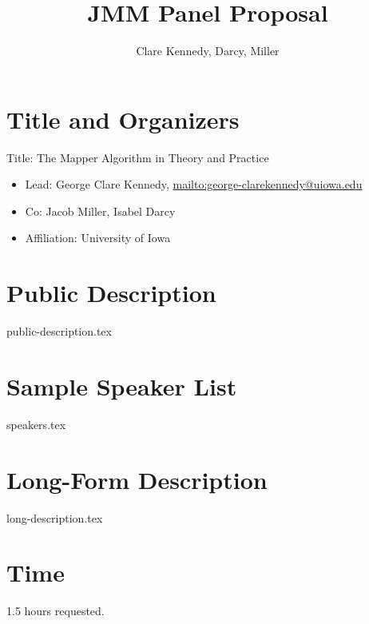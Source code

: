 \documentclass{article}
\title{JMM Panel Proposal}
\author{Clare Kennedy, Darcy, Miller}
\date{}
\begin{document}
\maketitle

\section{Title and Organizers}

Title: The Mapper Algorithm in Theory and Practice

\begin{itemize}
    \item Lead: George Clare Kennedy, \url{mailto:george-clarekennedy@uiowa.edu}
    \item Co: Jacob Miller, Isabel Darcy
    \item Affiliation: University of Iowa
\end{itemize}

\section{Public Description}
{public-description.tex}

\section{Sample Speaker List}
{speakers.tex}

\section{Long-Form Description}
{long-description.tex}

\section{Time}

1.5 hours requested.
\end{document}
